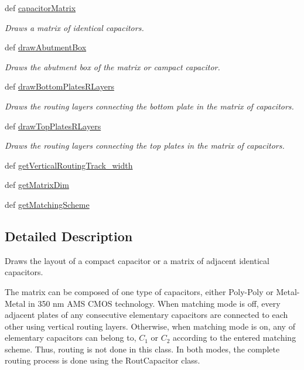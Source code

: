 \begin{DoxyCompactItemize}
def \hyperlink{classpython_1_1CapacitorMatrix_1_1CapacitorStack_acd1475de157c5375cd58ccf98f825055}{capacitor\-Matrix}
\begin{DoxyCompactList}\small\item\em Draws a matrix of identical capacitors. \end{DoxyCompactList}\item 
def \hyperlink{classpython_1_1CapacitorMatrix_1_1CapacitorStack_ac5cd73be473bc321a29a75311f808835}{draw\-Abutment\-Box}
\begin{DoxyCompactList}\small\item\em Draws the abutment box of the matrix or campact capacitor. \end{DoxyCompactList}\item 
def \hyperlink{classpython_1_1CapacitorMatrix_1_1CapacitorStack_ac815a7351301379178cd6352e6ee46cd}{draw\-Bottom\-Plates\-R\-Layers}
\begin{DoxyCompactList}\small\item\em Draws the routing layers connecting the bottom plate in the matrix of capacitors. \end{DoxyCompactList}\item 
def \hyperlink{classpython_1_1CapacitorMatrix_1_1CapacitorStack_ac4efd1ea3fef3eaa9a07798c9157ea11}{draw\-Top\-Plates\-R\-Layers}
\begin{DoxyCompactList}\small\item\em Draws the routing layers connecting the top plates in the matrix of capacitors. \end{DoxyCompactList}\item 
def \hyperlink{classpython_1_1CapacitorMatrix_1_1CapacitorStack_a54ac11219d9fce4c7336f4a50e69959a}{get\-Vertical\-Routing\-Track\-\_\-width}
\item 
def \hyperlink{classpython_1_1CapacitorMatrix_1_1CapacitorStack_af5105be38ca05d15559b998f1da475df}{get\-Matrix\-Dim}
\item 
def \hyperlink{classpython_1_1CapacitorMatrix_1_1CapacitorStack_a73209c91d8a68eb52e957dee22e05a55}{get\-Matching\-Scheme}
\end{DoxyCompactItemize}


\subsection{Detailed Description}
Draws the layout of a compact capacitor or a matrix of adjacent identical capacitors. 

The matrix can be composed of one type of capacitors, either Poly-\/\-Poly or Metal-\/\-Metal in 350 nm A\-M\-S C\-M\-O\-S technology. When matching mode is off, every adjacent plates of any consecutive elementary capacitors are connected to each other using vertical routing layers. Otherwise, when matching mode is on, any of elementary capacitors can belong to, $ C_1 $ or $ C_2 $ according to the entered matching scheme. Thus, routing is not done in this class. In both modes, the complete routing process is done using the {\ttfamily Rout\-Capacitor} class. 


